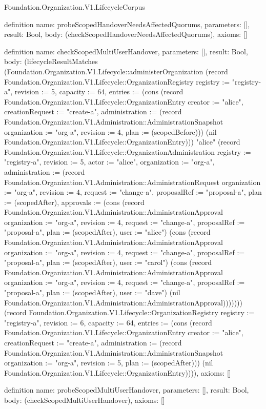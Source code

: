 \begin{lexlean}{Foundation.Organization.V1.LifecycleCorpus}
\begin{semanticmodule}
definition{
  name: probeScopedHandoverNeedsAffectedQuorums,
  parameters: [],
  result: Bool,
  body: (checkScopedHandoverNeedsAffectedQuorums),
  axioms: []
}

definition{
  name: checkScopedMultiUserHandover,
  parameters: [],
  result: Bool,
  body: (lifecycleResultMatches (Foundation.Organization.V1.Lifecycle::administerOrganization (record Foundation.Organization.V1.Lifecycle::OrganizationRegistry {registry := "registry-a", revision := 5, capacity := 64, entries := (cons (record Foundation.Organization.V1.Lifecycle::OrganizationEntry {creator := "alice", creationRequest := "create-a", administration := (record Foundation.Organization.V1.Administration::AdministrationSnapshot {organization := "org-a", revision := 4, plan := (scopedBefore)})}) (nil Foundation.Organization.V1.Lifecycle::OrganizationEntry))}) "alice" (record Foundation.Organization.V1.Lifecycle::OrganizationAdministration {registry := "registry-a", revision := 5, actor := "alice", organization := "org-a", administration := (record Foundation.Organization.V1.Administration::AdministrationRequest {organization := "org-a", revision := 4, request := "change-a", proposalRef := "proposal-a", plan := (scopedAfter), approvals := (cons (record Foundation.Organization.V1.Administration::AdministrationApproval {organization := "org-a", revision := 4, request := "change-a", proposalRef := "proposal-a", plan := (scopedAfter), user := "alice"}) (cons (record Foundation.Organization.V1.Administration::AdministrationApproval {organization := "org-a", revision := 4, request := "change-a", proposalRef := "proposal-a", plan := (scopedAfter), user := "carol"}) (cons (record Foundation.Organization.V1.Administration::AdministrationApproval {organization := "org-a", revision := 4, request := "change-a", proposalRef := "proposal-a", plan := (scopedAfter), user := "dave"}) (nil Foundation.Organization.V1.Administration::AdministrationApproval))))})})) (record Foundation.Organization.V1.Lifecycle::OrganizationRegistry {registry := "registry-a", revision := 6, capacity := 64, entries := (cons (record Foundation.Organization.V1.Lifecycle::OrganizationEntry {creator := "alice", creationRequest := "create-a", administration := (record Foundation.Organization.V1.Administration::AdministrationSnapshot {organization := "org-a", revision := 5, plan := (scopedAfter)})}) (nil Foundation.Organization.V1.Lifecycle::OrganizationEntry))})),
  axioms: []
}

definition{
  name: probeScopedMultiUserHandover,
  parameters: [],
  result: Bool,
  body: (checkScopedMultiUserHandover),
  axioms: []
}


\end{semanticmodule}
\end{lexlean}
